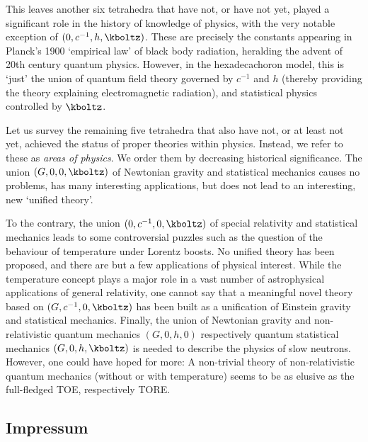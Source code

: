 \documentclass{scrartcl}
\begin{document}
This leaves another six tetrahedra that have not, or have not yet, played a significant role in the history of knowledge of physics, with the very notable exception of $(0,c^{-1},h,\kboltz)$. These are precisely the constants appearing in Planck's 1900 \enquote*{empirical law} of black body radiation, heralding the advent of 20th century quantum physics. However, in the hexadecachoron model, this is \enquote*{just} the union of quantum field theory governed by $c^{-1}$ and $h$ (thereby providing the theory explaining electromagnetic radiation), and statistical physics controlled by $\kboltz$. 

Let us survey the remaining five tetrahedra that also have not, or at least not yet, achieved the status of proper theories within physics. Instead, we refer to these as \textit{areas of physics}. We order them by decreasing historical significance. The union $(G,0,0,\kboltz)$ of Newtonian gravity and statistical mechanics causes no problems, has many interesting applications, but does not lead to an interesting, new \enquote*{unified theory}.

To the contrary, the union $(0,c^{-1},0,\kboltz)$ of special relativity and statistical mechanics leads to some controversial puzzles such as the question of the behaviour of temperature under Lorentz boosts. No unified theory has been proposed, and there are but a few applications of physical interest. While the temperature concept plays a major role in a vast number of astrophysical applications of general relativity, one cannot say that a meaningful novel theory based on $(G,c^{-1},0,\kboltz)$ has been built as a unification of Einstein gravity and statistical mechanics. Finally, the union of Newtonian gravity and non-relativistic quantum mechanics $(G,0,h,0)$ respectively quantum statistical mechanics $(G,0,h,\kboltz)$ is needed to describe the physics of slow neutrons. However, one could have hoped for more: A non-trivial theory of non-relativistic quantum mechanics (without or with temperature) seems to be as elusive as the full-fledged TOE, respectively TORE.

\subsection*{Impressum}


\end{document}
